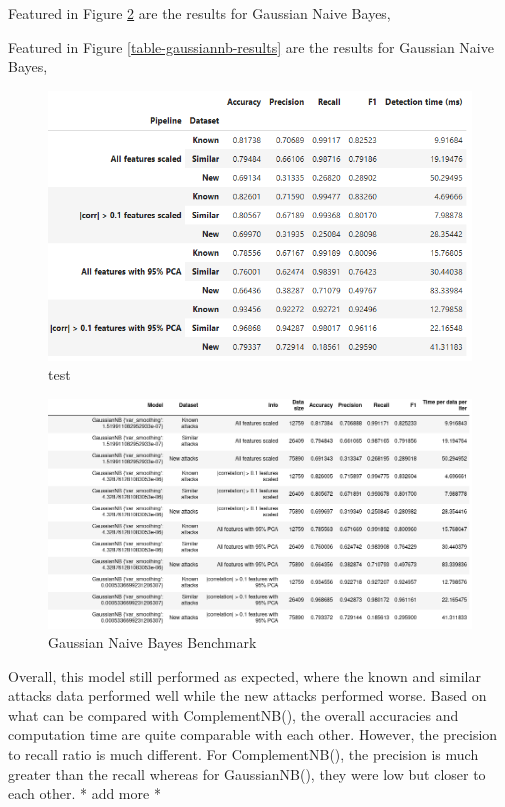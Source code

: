 Featured in Figure \ref{fig:gaus_nb_bench} are the results for Gaussian Naive Bayes,

Featured in Figure \ref{table-gaussiannb-results} are the results for Gaussian Naive Bayes,


\begin{figure}
    \centering
    \includegraphics[width=1\linewidth]{figures//naive_bayes/gaus_nb_bench_pretty.png}
    \caption{test}
    \label{fig:enter-label}
\end{figure}
\begin{figure}
    \centering
    \includegraphics[width=1\linewidth]{figures//naive_bayes/gaus_nb_bench.png}
    \caption{Gaussian Naive Bayes Benchmark}
    \label{fig:gaus_nb_bench}
\end{figure}

Overall, this model still performed as expected, where the known and similar attacks data performed well while the new attacks performed worse. Based on what can be compared with ComplementNB(), the overall accuracies and computation time are quite comparable with each other. However, the precision to recall ratio is much different. For ComplementNB(), the precision is much greater than the recall whereas for GaussianNB(), they were low but closer to each other. * add more *

